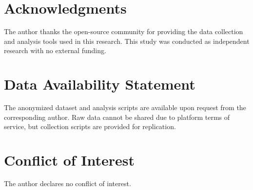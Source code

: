 \documentclass[12pt,a4paper]{article}
\begin{document}
\section*{Acknowledgments}

The author thanks the open-source community for providing the data collection and analysis tools used in this research. This study was conducted as independent research with no external funding.

\section*{Data Availability Statement}

The anonymized dataset and analysis scripts are available upon request from the corresponding author. Raw data cannot be shared due to platform terms of service, but collection scripts are provided for replication.

\section*{Conflict of Interest}

The author declares no conflict of interest.

\newpage

\end{document}
